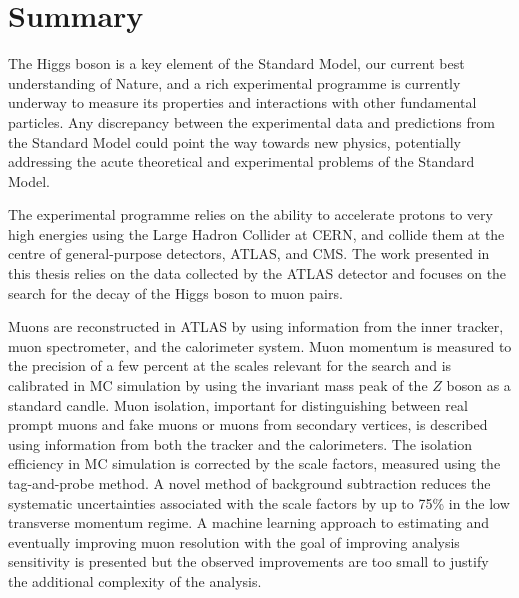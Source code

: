 \chapter*{Summary}

The Higgs boson is a key element of the Standard Model,
our current best understanding of Nature, and a rich experimental
programme is currently underway to measure its properties
and interactions with other fundamental particles. Any
discrepancy between the experimental data and predictions
from the Standard Model could point the way towards new
physics, potentially addressing the acute theoretical
and experimental problems of the Standard Model.

The experimental programme relies on the ability to
accelerate protons to very high energies using the Large
Hadron Collider at CERN, and collide them at the centre of
general-purpose detectors, ATLAS, and CMS. The work presented
in this thesis relies on the data collected by the ATLAS
detector and focuses on the search for the decay of the
Higgs boson to muon pairs.

Muons are reconstructed in ATLAS by using information
from the inner tracker, muon spectrometer, and the
calorimeter system. Muon momentum is measured to the
precision of a few percent at the scales relevant for
the search and is calibrated in MC simulation by using
the invariant mass peak of the $Z$ boson as a standard
candle. Muon isolation, important for distinguishing
between real prompt muons and fake muons or muons from
secondary vertices, is described using information from
both the tracker and the calorimeters. The isolation
efficiency in MC simulation is corrected by the scale
factors, measured using the tag-and-probe method. A
novel method of background subtraction reduces the
systematic uncertainties associated with the
scale factors by up to 75\% in the low transverse
momentum regime. A machine learning approach to
estimating and eventually improving muon resolution
with the goal of improving analysis sensitivity is
presented but the observed improvements are too small
to justify the additional complexity of the analysis.

